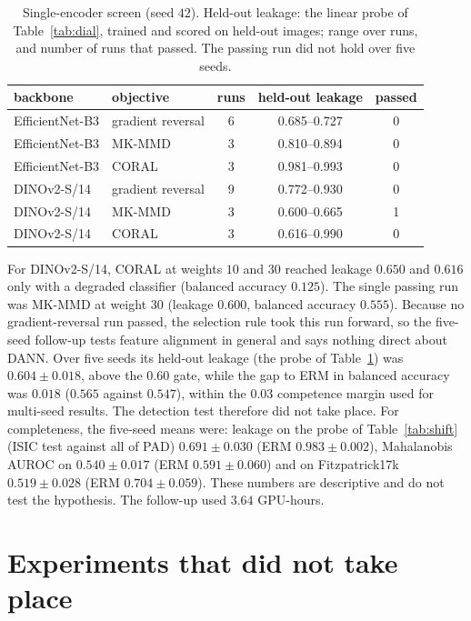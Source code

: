 \documentclass{midl}
\begin{document}
\begin{table}[h]
\centering
\caption{Single-encoder screen (seed $42$). Held-out leakage: the linear probe of Table~\ref{tab:dial}, trained and scored
on held-out images; range over runs, and number of runs that passed. The passing run did not hold over five seeds.}
\label{tab:r8}
\begin{tabular}{llccc}
\toprule
backbone & objective & runs & held-out leakage & passed \\
\midrule
EfficientNet-B3 & gradient reversal & 6 & 0.685--0.727 & 0 \\
EfficientNet-B3 & MK-MMD & 3 & 0.810--0.894 & 0 \\
EfficientNet-B3 & CORAL & 3 & 0.981--0.993 & 0 \\
DINOv2-S/14 & gradient reversal & 9 & 0.772--0.930 & 0 \\
DINOv2-S/14 & MK-MMD & 3 & 0.600--0.665 & 1 \\
DINOv2-S/14 & CORAL & 3 & 0.616--0.990 & 0 \\
\bottomrule
\end{tabular}
\end{table}

For DINOv2-S/14, CORAL at weights $10$ and $30$ reached leakage $0.650$ and $0.616$ only with a
degraded classifier (balanced accuracy $0.125$). The single passing run was MK-MMD at weight $30$
(leakage $0.600$, balanced accuracy $0.555$). Because no gradient-reversal run passed, the
selection rule took this run forward, so the five-seed follow-up tests feature alignment in
general and says nothing direct about DANN. Over five seeds its held-out leakage (the probe of Table~\ref{tab:r8}) was $0.604\pm0.018$, above
the $0.60$ gate, while the gap to ERM in balanced accuracy was $0.018$ ($0.565$ against $0.547$),
within the $0.03$ competence margin used for multi-seed results. The detection test therefore did not take
place. For completeness, the five-seed means were: leakage on the probe of Table~\ref{tab:shift} (ISIC test against
all of PAD) $0.691\pm0.030$ (ERM $0.983\pm0.002$), Mahalanobis AUROC on \texttt{} $0.540\pm0.017$ (ERM
$0.591\pm0.060$) and on Fitzpatrick17k $0.519\pm0.028$ (ERM $0.704\pm0.059$). These numbers are
descriptive and do not test the hypothesis. The follow-up used $3.64$ GPU-hours.

\FloatBarrier
\section{Experiments that did not take place}
\label{app:external}
\end{document}
